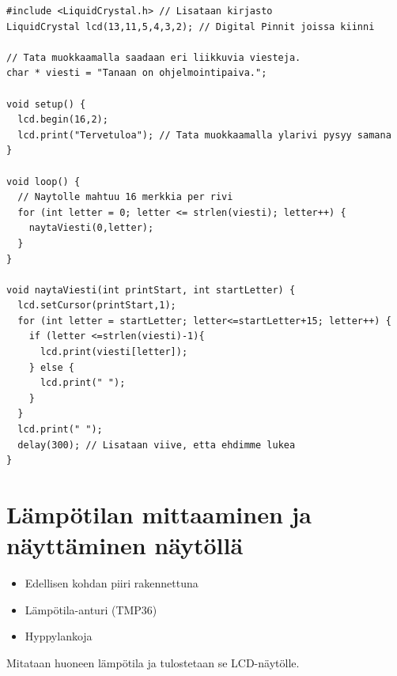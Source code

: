 \begin{tcolorbox}[colback=yellow!10, title={Koodaa!},colbacktitle=orange,breakable]
\begin{solution}
\begin{lstlisting}
#include <LiquidCrystal.h> // Lisataan kirjasto 
LiquidCrystal lcd(13,11,5,4,3,2); // Digital Pinnit joissa kiinni

// Tata muokkaamalla saadaan eri liikkuvia viesteja. 
char * viesti = "Tanaan on ohjelmointipaiva.";

void setup() {
  lcd.begin(16,2);
  lcd.print("Tervetuloa"); // Tata muokkaamalla ylarivi pysyy samana
}

void loop() {
  // Naytolle mahtuu 16 merkkia per rivi
  for (int letter = 0; letter <= strlen(viesti); letter++) {
    naytaViesti(0,letter);
  }
}

void naytaViesti(int printStart, int startLetter) {
  lcd.setCursor(printStart,1);
  for (int letter = startLetter; letter<=startLetter+15; letter++) {
    if (letter <=strlen(viesti)-1){
      lcd.print(viesti[letter]);
    } else {
      lcd.print(" ");
    }
  }
  lcd.print(" ");
  delay(300); // Lisataan viive, etta ehdimme lukea
}
\end{lstlisting}
\end{solution}
\end{tcolorbox}

\clearpage
\section{Lämpötilan mittaaminen ja näyttäminen näytöllä}
\begin{minipage}{0.5\textwidth}
\begin{tcolorbox}[colback=lime!10,title=Tarvikkeet, colbacktitle=green!10,coltitle=black]
\begin{itemize}
    \item Edellisen kohdan piiri rakennettuna
    \item Lämpötila-anturi (TMP36)
    \item Hyppylankoja
\end{itemize}
\end{tcolorbox}
\end{minipage}
\begin{minipage}{0.5\textwidth}
\begin{tcolorbox}[colback=blue!10,title=Piirin toiminta,colbacktitle=purple!90]
Mitataan huoneen lämpötila ja tulostetaan se LCD-näytölle.
\end{tcolorbox}
\end{minipage}

